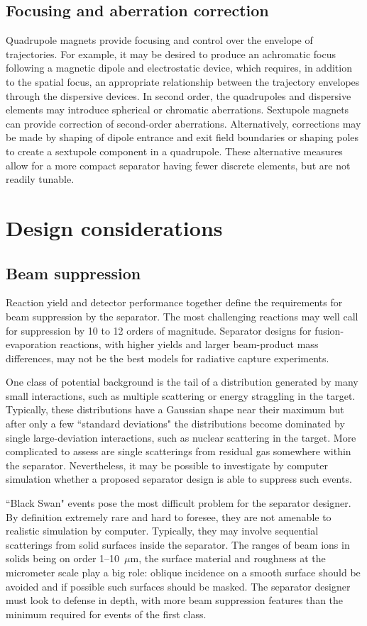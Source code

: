 \documentclass[12pt]{amsart}
\begin{document}
\subsection{Focusing and aberration correction}
Quadrupole magnets provide focusing and control over the envelope of trajectories.  For example, it may be desired to produce an achromatic focus following a magnetic dipole and electrostatic device, which requires, in addition to the spatial focus, an appropriate relationship between the trajectory envelopes through the dispersive devices.    In second order, the quadrupoles and dispersive elements may introduce spherical or chromatic aberrations.    Sextupole magnets can provide correction of second-order aberrations.   Alternatively, corrections may be made by shaping of dipole entrance and exit field boundaries   or shaping poles to create a sextupole component in a quadrupole.   These alternative measures allow for a more compact separator having fewer discrete elements, but  are not readily tunable.

\section{Design considerations}
\subsection{Beam suppression }
Reaction yield and detector performance together define the requirements for beam suppression by the separator.    The most challenging reactions  may well call for suppression by 10 to 12 orders of magnitude.    Separator designs for fusion-evaporation reactions, with higher yields and larger beam-product mass differences, may not be the best models  for radiative capture experiments.   
    
 One class of potential background is the tail of a  distribution generated by many small interactions, such as multiple scattering or energy straggling in the target.    Typically, these distributions have a Gaussian shape near their maximum but after only a few  ``standard deviations" the distributions become dominated by single large-deviation interactions, such as nuclear scattering in the target.    More complicated to assess are single scatterings from residual gas somewhere within the separator.   Nevertheless, it may be possible to investigate by computer simulation whether  a proposed separator design is able to suppress such events.
 
  ``Black Swan" events pose the most difficult problem for the separator designer.   By definition extremely rare and hard to foresee,  they are not  amenable to realistic simulation by computer.   Typically, they may involve sequential scatterings from  solid surfaces inside the separator.   The ranges of beam ions in solids being on order 1--10~$\mu$m, the surface material and roughness at the micrometer scale play a big role: oblique incidence on a smooth surface should be avoided and if possible such surfaces should be masked.   The separator designer must look to defense in depth, with more beam suppression features than the minimum required for events of the first  class.
  
\end{document}
